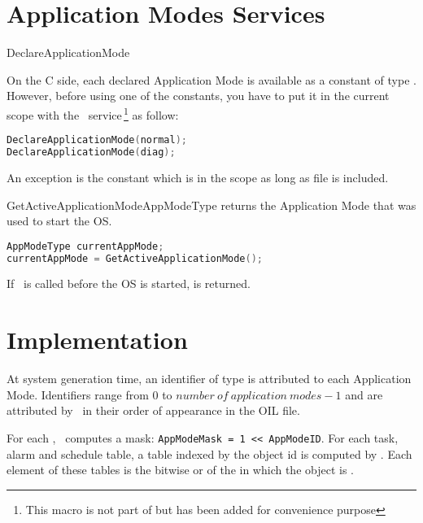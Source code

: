 \section{Application Modes Services}

\begin{service}{DeclareApplicationMode}{}

On the C side, each declared Application Mode is available as a constant of type . However, before using one of the constants, you have to put it in the current scope with the \servicename\ service\,\footnote{This macro is not part of \cite{OSEKOS223} but has been added for convenience purpose}  as follow:

\begin{lstlisting}[language=C]
DeclareApplicationMode(normal);
DeclareApplicationMode(diag);
\end{lstlisting}

An exception is the constant  which is in the scope as long as file  is included.

\end{service}

\begin{service}{GetActiveApplicationMode}{AppModeType}
 returns the Application Mode that was used to start the OS.
\begin{lstlisting}[language=C]
AppModeType currentAppMode;
currentAppMode = GetActiveApplicationMode();
\end{lstlisting}
If \apiname\ is called before the OS is started,  is returned.

\end{service}

\section{Implementation}

At system generation time, an identifier  of type  is attributed to each Application Mode.
Identifiers range from $0$ to $number~of~application~modes - 1$ and are attributed by \goil\ in their order of appearance in the OIL file.

For each , \goil\ computes a mask: \lstinline[language=OIL]{AppModeMask = 1 << AppModeID}.
For each task, alarm and schedule table, a table indexed by the object id is computed by \goil. Each element of these tables is the bitwise or of the  in which the object is .

